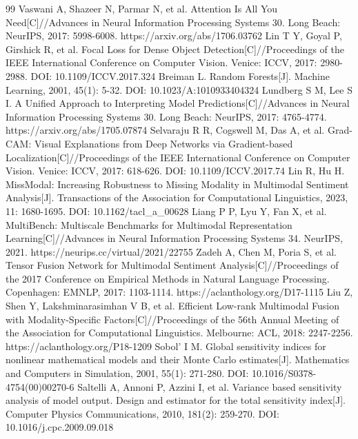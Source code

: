 \documentclass[bwprint]{gmcmthesis}
\begin{document}
\begin{thebibliography}{99}
 Vaswani A, Shazeer N, Parmar N, et al. Attention Is All You Need[C]//Advances in Neural Information Processing Systems 30. Long Beach: NeurIPS, 2017: 5998-6008. https://arxiv.org/abs/1706.03762
 Lin T Y, Goyal P, Girshick R, et al. Focal Loss for Dense Object Detection[C]//Proceedings of the IEEE International Conference on Computer Vision. Venice: ICCV, 2017: 2980-2988. DOI: 10.1109/ICCV.2017.324
 Breiman L. Random Forests[J]. Machine Learning, 2001, 45(1): 5-32. DOI: 10.1023/A:1010933404324
 Lundberg S M, Lee S I. A Unified Approach to Interpreting Model Predictions[C]//Advances in Neural Information Processing Systems 30. Long Beach: NeurIPS, 2017: 4765-4774. https://arxiv.org/abs/1705.07874
 Selvaraju R R, Cogswell M, Das A, et al. Grad-CAM: Visual Explanations from Deep Networks via Gradient-based Localization[C]//Proceedings of the IEEE International Conference on Computer Vision. Venice: ICCV, 2017: 618-626. DOI: 10.1109/ICCV.2017.74
 Lin R, Hu H. MissModal: Increasing Robustness to Missing Modality in Multimodal Sentiment Analysis[J]. Transactions of the Association for Computational Linguistics, 2023, 11: 1680-1695. DOI: 10.1162/tacl\_a\_00628
 Liang P P, Lyu Y, Fan X, et al. MultiBench: Multiscale Benchmarks for Multimodal Representation Learning[C]//Advances in Neural Information Processing Systems 34. NeurIPS, 2021. https://neurips.cc/virtual/2021/22755
 Zadeh A, Chen M, Poria S, et al. Tensor Fusion Network for Multimodal Sentiment Analysis[C]//Proceedings of the 2017 Conference on Empirical Methods in Natural Language Processing. Copenhagen: EMNLP, 2017: 1103-1114. https://aclanthology.org/D17-1115
 Liu Z, Shen Y, Lakshminarasimhan V B, et al. Efficient Low-rank Multimodal Fusion with Modality-Specific Factors[C]//Proceedings of the 56th Annual Meeting of the Association for Computational Linguistics. Melbourne: ACL, 2018: 2247-2256. https://aclanthology.org/P18-1209
 Sobol' I M. Global sensitivity indices for nonlinear mathematical models and their Monte Carlo estimates[J]. Mathematics and Computers in Simulation, 2001, 55(1): 271-280. DOI: 10.1016/S0378-4754(00)00270-6
 Saltelli A, Annoni P, Azzini I, et al. Variance based sensitivity analysis of model output. Design and estimator for the total sensitivity index[J]. Computer Physics Communications, 2010, 181(2): 259-270. DOI: 10.1016/j.cpc.2009.09.018

\end{thebibliography}
\end{document}
